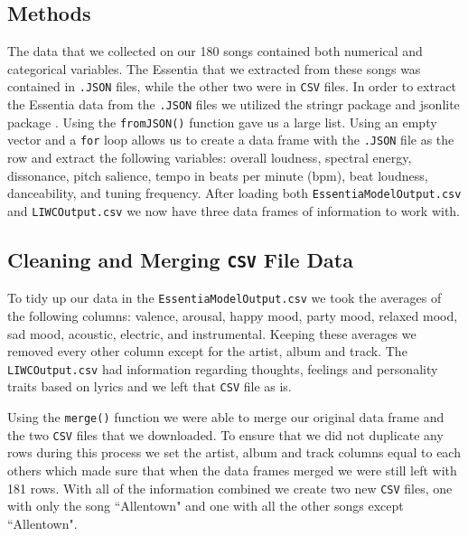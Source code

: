 \documentclass{article}\usepackage[]{graphicx}\usepackage[]{xcolor}
\begin{document}
\begin{multicols}{2}
\section{Methods}
The data that we collected on our 180 songs contained both numerical and categorical variables. The Essentia that we extracted from these songs was contained in \texttt{.JSON} files, while the other two were in \texttt{CSV} files. In order to extract the Essentia \citep{essentia} data from the \texttt{.JSON} files we utilized the stringr package \citep{stringr} and jsonlite package \citep{jsonlite}. Using the {\tt{fromJSON()}} function gave us a large list. Using an empty vector and a \texttt{for} loop allows us to create a data frame with the \texttt{.JSON} file as the row and extract the following variables: overall loudness, spectral energy, dissonance, pitch salience, tempo in beats per minute (bpm), beat loudness, danceability, and tuning frequency. After loading both \texttt{EssentiaModelOutput.csv} and \texttt{LIWCOutput.csv} we now have three data frames of information to work with.  
 

\subsection{Cleaning and Merging \texttt{CSV} File Data}
To tidy up our data in the \texttt{EssentiaModelOutput.csv} we took the averages of the following columns: valence, arousal, happy mood, party mood, relaxed mood, sad mood, acoustic, electric, and instrumental. Keeping these averages we removed every other column except for the artist, album and track. The {\texttt{LIWCOutput.csv}} had information regarding thoughts, feelings and personality traits based on lyrics and we left that \texttt{CSV} file as is.

Using the \verb|merge()| function we were able to merge our original data frame and the two {\texttt{CSV}} files that we downloaded. To ensure that we did not duplicate any rows during this process we set the artist, album and track columns equal to each others which made sure that when the data frames merged we were still left with 181 rows. With all of the information combined we create two new {\texttt{CSV}} files, one with only the song ``Allentown" and one with all the other songs except ``Allentown".


\end{multicols}
\end{document}

